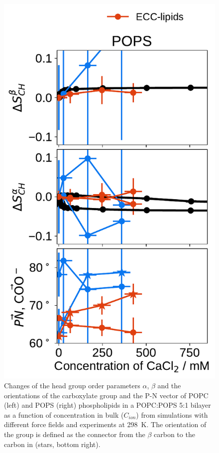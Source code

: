 \documentclass[journal=jpcbfk,manuscript=article]{achemso}
\newlength{\figwidth}
\newlength{\figwidthsmall}
\begin{document}
\begin{figure}[tbp!]
  \includegraphics[width=\figwidthsmall]{../img/ecc_pops/order_parameters_changes_ecc-lip_L14_A-B-PN-COO_POPS_cacl.pdf} 
  \caption{\label{fig:delta_ordPar_CaCl_PCPS} 
    Changes of the head group order parameters $\alpha$, $\beta$ and the orientations of the carboxylate group and the P-N vector  
    of POPC (left) and POPS (right) phospholipids in a POPC:POPS 5:1 bilayer as a function of  concentration 
    in bulk ($C_{ion}$) from simulations with different force fields and experiments at 298~K. \citep{roux90}
    The orientation of the  group is defined as 
    the connector from the $\beta$ carbon to the carbon in  (stars, bottom right). 
  } 
\end{figure} 
\end{document}
